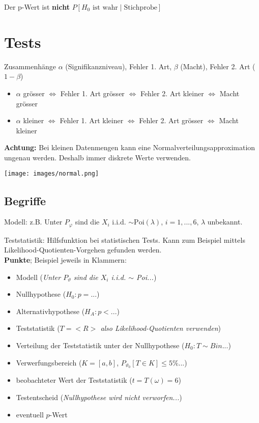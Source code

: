 Der p-Wert ist \textbf{nicht} $P[H_0 \text{ ist wahr} \mid \text{Stichprobe}]$

\section{Tests}

Zusammenhänge $\alpha$ (Signifikanzniveau), Fehler 1. Art, $\beta$ (Macht), Fehler 2. Art ($1-\beta$)

\begin{itemize}
	\item $\alpha$ grösser $\iff$ Fehler 1. Art grösser $\iff$ Fehler 2. Art kleiner $\iff$ Macht grösser
	\item $\alpha$ kleiner $\iff$ Fehler 1. Art kleiner $\iff$ Fehler 2. Art grösser $\iff$ Macht kleiner
\end{itemize}

\textbf{Achtung:} Bei kleinen Datenmengen kann eine Normalverteilungsapproximation ungenau werden. Deshalb immer diskrete Werte verwenden.

\texttt{[image: images/normal.png]}

\subsection{Begriffe}

Modell: z.B. Unter $P_\varphi$ sind die $X_i$ i.i.d. $\sim\text{Poi}(\lambda)$, $i=1, ..., 6$, $\lambda$ unbekannt.

Teststatistik: Hilfsfunktion bei statistischen Tests. Kann zum Beispiel mittels Likelihood-Quotienten-Vorgehen gefunden werden.\\

\textbf{Punkte}; Beispiel jeweils in Klammern:
\begin{itemize}
	 \item Modell (\textit{Unter $P_\vartheta$ sind die $X_i$ i.i.d. $\sim$ Poi...})
	 \item Nullhypothese (\textit{$H_0: p = ...$})
	 \item Alternativhypothese (\textit{$H_A: p < ...$})
	 \item Teststatistik  (\textit{$T= <R>$ also Likelihood-Quotienten verwenden})
	 \item Verteilung der Teststatistik unter der Nullhypothese (\textit{$H_0: T \sim Bin...$})
	 \item Verwerfungsbereich ($K = [a, b]$, $P_{\vartheta_0}[T\in K] \leq 5\%...$)
	 \item beobachteter Wert der Teststatistik ($t=T(\omega)=6$)
	 \item Testentscheid (\textit{Nullhypothese wird nicht verworfen...})
	 \item eventuell $p$-Wert
\end{itemize}


